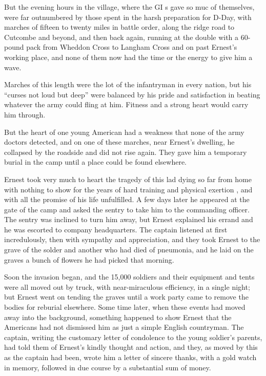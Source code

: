 But the evening hours in the village, where the GI s gave so muc of themselves, were far outnumbered by those spent in the harsh preparation for D-Day, with marches of fifteen to twenty miles in battle order, along the ridge road to Cutcombe and beyond, and then back again, running at the double with a 60-pound pack from Wheddon Cross to Langham Cross and on past Ernest’s working place, and none of them now had the time or the energy to give him a wave.

Marches of this length were the lot of the infantryman in every nation, but his “curses not loud but deep” were balanced by his pride and satisfaction in beating whatever the army could fling at him. Fitness and a strong heart would carry him through. 

But the heart of one young American had a weakness that none of the army doctors detected, and on one of these marches, near Ernest’s dwelling, he collapsed by the roadside and did not rise again. They gave him a temporary burial in the camp until a place could be found elsewhere. 

Ernest took very much to heart the tragedy of this lad dying so far from home with nothing to show for the years of hard training and physical exertion , and with all the promise of his life unfulfilled. A few days later he appeared at the gate of the camp and asked the sentry to take him to the commanding officer. The sentry was inclined to turn him away, but Ernest explained his errand and he was escorted to company headquarters. The captain listened at first incredulously, then with sympathy and appreciation, and they took Ernest to the grave of the solder and another who had died of pneumonia, and he laid on the graves a bunch of flowers he had picked that morning. 

Soon the invasion began, and the 15,000 soldiers and their equipment and tents were all moved out by truck, with near-miraculous efficiency, in a single night; but Ernest went on tending the graves until a work party came to remove the bodies for reburial elsewhere. Some time later, when these events had moved away into the background, something happened to show Ernest that the Americans had not dismissed him as just a simple English countryman. The captain, writing the customary letter of condolence to the young soldier’s parents, had told them of Ernest’s kindly thought and action, and they, as moved by this as the captain had been, wrote him a letter of sincere thanks, with a gold watch in memory, followed in due course by a substantial sum of money. 

